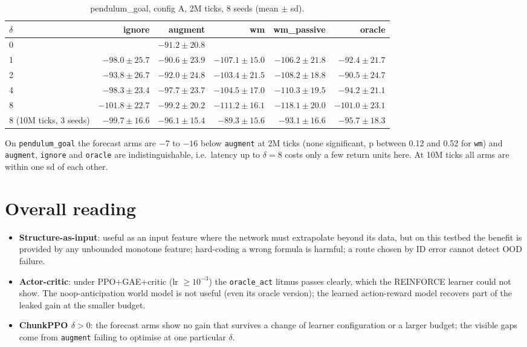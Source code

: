 \documentclass[11pt]{article}
\begin{document}
\begin{table}[h]
\centering\small
\caption{pendulum\_goal, config A, 2M ticks, 8 seeds (mean $\pm$ sd).}
\begin{tabular}{lrrrrr}
\toprule
$\delta$ & ignore & augment & wm & wm\_passive & oracle \\
\midrule
0 & & $-91.2\pm20.8$ & & & \\
1 & $-98.0\pm25.7$ & $-90.6\pm23.9$ & $-107.1\pm15.0$ & $-106.2\pm21.8$ & $-92.4\pm21.7$ \\
2 & $-93.8\pm26.7$ & $-92.0\pm24.8$ & $-103.4\pm21.5$ & $-108.2\pm18.8$ & $-90.5\pm24.7$ \\
4 & $-98.3\pm23.4$ & $-97.7\pm23.7$ & $-104.5\pm17.0$ & $-110.3\pm19.5$ & $-94.2\pm21.1$ \\
8 & $-101.8\pm22.7$ & $-99.2\pm20.2$ & $-111.2\pm16.1$ & $-118.1\pm20.0$ & $-101.0\pm23.1$ \\
\midrule
8 (10M ticks, 3 seeds) & $-99.7\pm16.6$ & $-96.1\pm15.4$ & $-89.3\pm15.6$ & $-93.1\pm16.6$ & $-95.7\pm18.3$ \\
\bottomrule
\end{tabular}
\end{table}
On \texttt{pendulum\_goal} the forecast arms are $-7$ to $-16$ below \texttt{augment} at 2M ticks (none significant, p between 0.12 and 0.52 for \texttt{wm}) and \texttt{augment}, \texttt{ignore} and \texttt{oracle} are indistinguishable, i.e.\ latency up to $\delta=8$ costs only a few return units here. At 10M ticks all arms are within one sd of each other.

\section{Overall reading}
\begin{itemize}
\item \textbf{Structure-as-input}: useful as an input feature where the network must extrapolate beyond its data, but on this testbed the benefit is provided by any unbounded monotone feature; hard-coding a wrong formula is harmful; a route chosen by ID error cannot detect OOD failure.
\item \textbf{Actor-critic}: under PPO+GAE+critic (lr $\ge10^{-3}$) the \texttt{oracle\_act} litmus passes clearly, which the REINFORCE learner could not show. The noop-anticipation world model is not useful (even its oracle version); the learned action-reward model recovers part of the leaked gain at the smaller budget.
\item \textbf{ChunkPPO $\delta>0$}: the forecast arms show no gain that survives a change of learner configuration or a larger budget; the visible gaps come from \texttt{augment} failing to optimise at one particular $\delta$.
\end{itemize}
\end{document}
